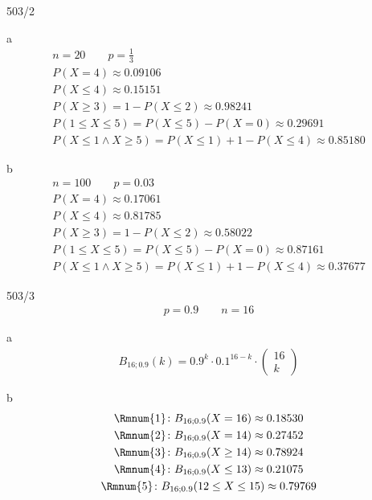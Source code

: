 \begin{exercise}{503/2}
  \item [a]
  \begin{gather*}
    n = 20 \qquad p = \frac{1}{3} \\
    P(X = 4) \approx 0.09106 \\
    P(X \leq 4) \approx 0.15151 \\
    P(X \geq 3) = 1 - P(X \leq 2) \approx 0.98241 \\
    P(1 \leq X \leq 5) = P(X \leq 5) - P(X = 0) \approx 0.29691 \\
    P(X \leq 1 \wedge X \geq 5) = P(X \leq 1) + 1 - P(X \leq 4) \approx 0.85180
  \end{gather*}
  \item [b]
  \begin{gather*}
    n = 100 \qquad p = 0.03 \\
    P(X = 4) \approx 0.17061 \\
    P(X \leq 4) \approx 0.81785 \\
    P(X \geq 3) = 1 - P(X \leq 2) \approx 0.58022 \\
    P(1 \leq X \leq 5) = P(X \leq 5) - P(X = 0) \approx 0.87161 \\
    P(X \leq 1 \wedge X \geq 5) = P(X \leq 1) + 1 - P(X \leq 4) \approx 0.37677
  \end{gather*}
\end{exercise}
\begin{exercise}{503/3}
  \begin{gather*}
    p = 0.9 \qquad n = 16
  \end{gather*}
  \item [a]
  \begin{gather*}
    B_{16;0.9}(k) = 0.9^k \cdot 0.1^{16 - k} \cdot \begin{pmatrix}16 \\ k\end{pmatrix}
  \end{gather*}
  \item [b]
  \begin{gather*}
    \text{\Rmnum{1}} \colon B_{16;0.9}(X = 16) \approx 0.18530 \\
    \text{\Rmnum{2}} \colon B_{16;0.9}(X = 14) \approx 0.27452 \\
    \text{\Rmnum{3}} \colon B_{16;0.9}(X \geq 14) \approx 0.78924 \\
    \text{\Rmnum{4}} \colon B_{16;0.9}(X \leq 13) \approx 0.21075 \\
    \text{\Rmnum{5}} \colon B_{16;0.9}(12 \leq X \leq 15) \approx 0.79769
  \end{gather*}
\end{exercise}
